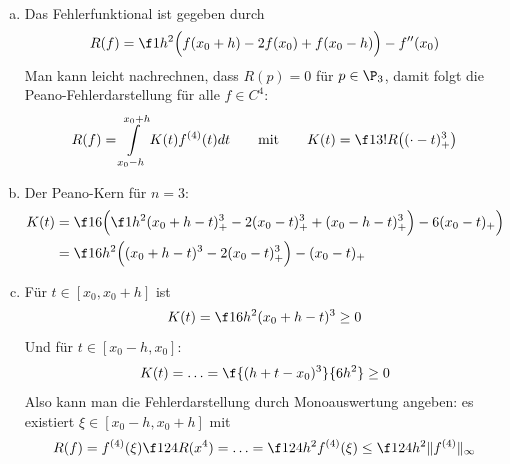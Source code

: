 \documentclass{mywork}
\begin{document}
\begin{aufgabe}~

	\begin{enumerate}[a)]
		\item
			Das Fehlerfunktional ist gegeben durch
			\[
				R(f) = \f 1{h^2} \Big( f(x_0+h) - 2f(x_0) + f(x_0-h) \Big) - f''(x_0)
			\]
			Man kann leicht nachrechnen, dass $R(p)=0$ für $p\in \P_3$, damit folgt die Peano-Fehlerdarstellung für alle $f\in C^4$:
			\[
				R(f) = \int\limits_{x_0-h}^{x_0+h} K(t) f^{(4)}(t) dt
				\qquad\text{mit}\qquad
				K(t) = \f 1{3!}R\big((\cdot - t)_+^3\big)
			\]
		\item
			Der Peano-Kern für $n=3$:
			\begin{align*}
				K(t) 
				&= \f 16 \Big( \f 1{h^2} (x_0+h-t)_+^3 - 2(x_0-t)_+^3 + (x_0-h-t)_+^3 \Big) - 6(x_0-t)_+ \Big) \\
				&= \f 1{6h^2} \Big( (x_0 + h - t)^3 - 2(x_0 - t)_+^3 \Big) - (x_0 - t)_+
			\end{align*}
		\item
			Für $t\in[x_0,x_0+h]$ ist
			\[
				K(t) = \f 1{6h^2}(x_0+h-t)^3 \ge 0
			\]
			Und für $t\in[x_0-h,x_0]$:
			\[
				K(t) = \dotsc = \f {(h+t-x_0)^3}{6h^2} \ge 0
			\]
			Also kann man die Fehlerdarstellung durch Monoauswertung angeben:
			es existiert $\xi \in [x_0-h, x_0+h]$ mit
			\[
				R(f) = f^{(4)}(\xi) \f 1{24} R(x^4) = \dotsc = \f 1{24}h^2 f^{(4)}(\xi) \le \f 1{24} h^2 \|f^{(4)}\|_\infty
			\]
	\end{enumerate}		
\end{aufgabe}
\end{document}
